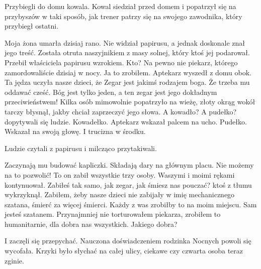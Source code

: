 Przybiegli do domu kowala.
Kowal siedział przed domem i popatrzył się na przybyszów w taki sposób, jak trener patrzy się na swojego zawodnika, który przybiegł ostatni.
\begin{dialogue}
	\ds{} Moja żona umarła dzisiaj rano. \dm{} Nie widział papirusu, a jednak doskonale znał jego treść. \dm{} Została otruta naszyjnikiem z masy solnej, który ktoś jej podarował. \dm{}
		Przebił właściciela papirusu wzrokiem. \dm{} Kto? Na pewno nie piekarz, którego zamordowaliście dzisiaj w nocy.
	\ds{} Ja to zrobiłem. \dm{} Aptekarz wyszedł z domu obok. \dm{} Ta jędza uczyła nasze dzieci, że Zegar jest jakimś rodzajem boga. Że trzeba mu oddawać cześć.
		Bóg jest tylko jeden, a ten zegar jest jego dokładnym przeciwieństwem! \dm{} Kilka osób mimowolnie popatrzyło na wieżę, złoty okrąg wokół tarczy błysnął, jakby chciał zaprzeczyć jego słowa.
	\ds{} A kowadło? A pudełko? \dm{} dopytywali się ludzie.
	\ds{} Kowadełko. \dm{} Aptekarz wskazał palcem na ucho. \dm{} Pudełko. \dm{} Wskazał na swoją głowę. \dm{} I trucizna w środku.
\end{dialogue}
Ludzie czytali z papirusu i milcząco przytakiwali.
\begin{dialogue}
	\ds{} Zaczynają mu budować kapliczki. Składają dary na głównym placu. Nie możemy na to pozwolić! To on zabił wszystkie trzy osoby. Waszymi i moimi rękami \dm{} kontynuował.
	\ds{} Zabiłeś tak samo, jak zegar, jak śmiesz nas pouczać? \dm{} ktoś z tłumu wykrzyknął.
	\ds{} Zabiłem, żeby nasze dzieci nie zabijały w imię mechanicznego szatana, śmierć za więcej śmierci. Każdy z was zrobiłby to na moim miejscu.
	\ds{} Sam jesteś szatanem. 
	\ds{} Przynajmniej nie torturowałem piekarza, zrobiłem to humanitarnie, dla dobra nas wszystkich.
	\ds{} Jakiego dobra?
\end{dialogue}
I zaczęli się przepychać.
Nauczona doświadczeniem rodzinka Nocnych powoli się wycofała.
Krzyki było słychać na całej ulicy, ciekawe czy czwarta osoba teraz zginie.

